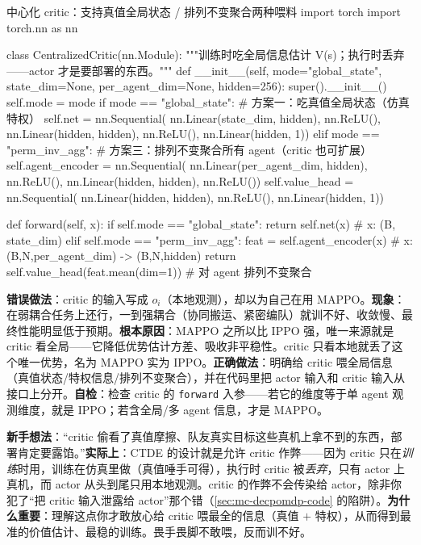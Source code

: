 \begin{codebox}[Python]{中心化 critic：支持真值全局状态 / 排列不变聚合两种喂料}
import torch
import torch.nn as nn

class CentralizedCritic(nn.Module):
    """训练时吃全局信息估计 V(s)；执行时丢弃——actor 才是要部署的东西。"""
    def __init__(self, mode="global_state", state_dim=None, per_agent_dim=None, hidden=256):
        super().__init__()
        self.mode = mode
        if mode == "global_state":                 # 方案一：吃真值全局状态（仿真特权）
            self.net = nn.Sequential(
                nn.Linear(state_dim, hidden), nn.ReLU(),
                nn.Linear(hidden, hidden), nn.ReLU(),
                nn.Linear(hidden, 1))
        elif mode == "perm_inv_agg":               # 方案三：排列不变聚合所有 agent（critic 也可扩展）
            self.agent_encoder = nn.Sequential(
                nn.Linear(per_agent_dim, hidden), nn.ReLU(),
                nn.Linear(hidden, hidden), nn.ReLU())
            self.value_head = nn.Sequential(
                nn.Linear(hidden, hidden), nn.ReLU(),
                nn.Linear(hidden, 1))

    def forward(self, x):
        if self.mode == "global_state":
            return self.net(x)                     # x: (B, state_dim)
        elif self.mode == "perm_inv_agg":
            feat = self.agent_encoder(x)           # x:(B,N,per_agent_dim) -> (B,N,hidden)
            return self.value_head(feat.mean(dim=1))   # 对 agent 排列不变聚合
\end{codebox}

\begin{pitfall}
\textbf{错误做法}：critic 的输入写成 $o_i$（本地观测），却以为自己在用 MAPPO。\textbf{现象}：在弱耦合任务上还行，一到强耦合（协同搬运、紧密编队）就训不好、收敛慢、最终性能明显低于预期。\textbf{根本原因}：MAPPO 之所以比 IPPO 强，唯一来源就是 critic 看全局——它降低优势估计方差、吸收非平稳性。critic 只看本地就丢了这个唯一优势，名为 MAPPO 实为 IPPO。\textbf{正确做法}：明确给 critic 喂全局信息（真值状态/特权信息/排列不变聚合），并在代码里把 actor 输入和 critic 输入从接口上分开。\textbf{自检}：检查 critic 的 \verb|forward| 入参——若它的维度等于单 agent 观测维度，就是 IPPO；若含全局/多 agent 信息，才是 MAPPO。
\end{pitfall}

\begin{pitfall}
\textbf{新手想法}：“critic 偷看了真值摩擦、队友真实目标这些真机上拿不到的东西，部署肯定要露馅。”\textbf{实际上}：CTDE 的设计就是允许 critic 作弊——因为 critic 只在\emph{训练}时用，训练在仿真里做（真值唾手可得），执行时 critic 被\emph{丢弃}，只有 actor 上真机，而 actor 从头到尾只用本地观测。critic 的作弊不会传染给 actor，除非你犯了“把 critic 输入泄露给 actor”那个错（\cref{sec:mc-decpomdp-code} 的陷阱）。\textbf{为什么重要}：理解这点你才敢放心给 critic 喂最全的信息（真值 $+$ 特权），从而得到最准的价值估计、最稳的训练。畏手畏脚不敢喂，反而训不好。
\end{pitfall}

